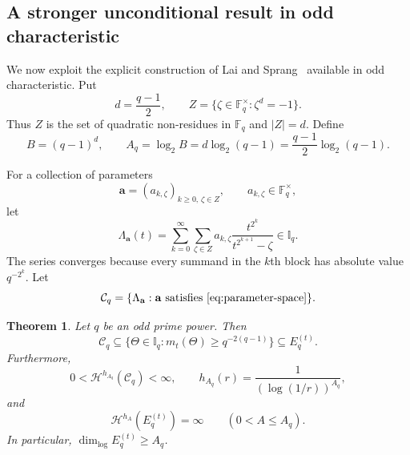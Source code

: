 \documentclass[11pt]{article}
\newtheorem{theorem}{Theorem}[section]
\newtheorem{corollary}[theorem]{Corollary}
\theoremstyle{remark}
\newcommand{\Haus}{\mathcal{H}}
\newcommand{\Iq}{\mathbb{I}_q}
\newcommand{\Et}{E_q^{(t)}}
\newcommand{\mt}{m_t}
\newcommand{\vp}[1]{{\color{red}  {#1}}}
\begin{document}
%
%

\subsection{A stronger unconditional result in odd characteristic}

We now exploit the explicit construction of Lai and Sprang~
\cite{LaiSprang2026} available in odd characteristic. Put
\begin{equation} \label{eq:d-and-Z}
 d=\frac{q-1}{2},
 \qquad
 Z=\{\zeta\in\mathbb F_q^\times:\zeta^d=-1\}.
\end{equation}
Thus $Z$ is the set of quadratic non-residues in $\mathbb F_q$ and
$|Z|=d$.  Define
\begin{equation} \label{eq:Aq}
 B=(q-1)^d,
 \qquad
 A_q=\log_2B=d\log_2(q-1)
      =\frac{q-1}{2}\log_2(q-1).
\end{equation}

For a collection of parameters
\begin{equation} \label{eq:parameter-space}
 \mathbf a=(a_{k,\zeta})_{k\geq0,\,\zeta\in Z},
 \qquad a_{k,\zeta}\in\mathbb F_q^\times,
\end{equation}
let
\begin{equation} \label{eq:parametrised-lambda}
 \Lambda_{\mathbf a}(t)
 =\sum_{k=0}^{\infty}\sum_{\zeta\in Z}
 a_{k,\zeta}\frac{t^{2^k}}{t^{2^{k+1}}-\zeta}
 \in\Iq.
\end{equation}
The series converges because every summand in the $k$th block has
absolute value $q^{-2^k}$.  Let
\begin{equation} \label{eq:Cq-family}
 \mathcal C_q=\{\Lambda_{\mathbf a}:\mathbf a
 \text{ satisfies }\eqref{eq:parameter-space}\}.
\end{equation}

\begin{theorem} \label{thm:t-odd-strong}
Let $q$ be an odd prime power.  Then
\begin{equation} \label{eq:family-exceptional}
 \mathcal C_q\subseteq
 \{\Theta\in\Iq:\mt(\Theta)\geq q^{-2(q-1)}\}
 \subseteq\Et.
\end{equation}
Furthermore,
\begin{equation} \label{eq:critical-family-measure}
 0<\Haus^{h_{A_q}}(\mathcal C_q)<\infty,
 \qquad
 h_{A_q}(r)=\frac1{(\log(1/r))^{A_q}},
\end{equation}
and
\begin{equation} \label{eq:odd-infinite-measure}
 \Haus^{h_A}(\Et)=\infty
 \qquad(0<A\leq A_q).
\end{equation}
In particular, $\dim_{\log}\Et\geq A_q$.
\end{theorem}
\end{document}
